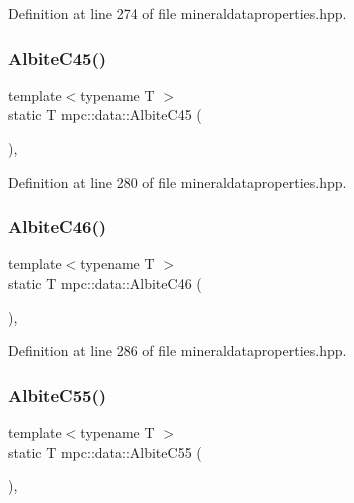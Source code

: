 Definition at line 274 of file mineraldataproperties.\+hpp.

\mbox{\label{namespacempc_1_1data_a42c2c3b8fc48f4389b0cf13f6fe2d993}} 
\subsubsection{\texorpdfstring{Albite\+C45()}{AlbiteC45()}}
{\footnotesize\ttfamily template$<$typename T $>$ \\
static T mpc\+::data\+::\+Albite\+C45 (\begin{DoxyParamCaption}{ }\end{DoxyParamCaption})\hspace{0.3cm}{\ttfamily [inline]}, {\ttfamily [static]}}



Definition at line 280 of file mineraldataproperties.\+hpp.

\mbox{\label{namespacempc_1_1data_ac964881e8421c24e60848c477b1a6377}} 
\subsubsection{\texorpdfstring{Albite\+C46()}{AlbiteC46()}}
{\footnotesize\ttfamily template$<$typename T $>$ \\
static T mpc\+::data\+::\+Albite\+C46 (\begin{DoxyParamCaption}{ }\end{DoxyParamCaption})\hspace{0.3cm}{\ttfamily [inline]}, {\ttfamily [static]}}



Definition at line 286 of file mineraldataproperties.\+hpp.

\mbox{\label{namespacempc_1_1data_ab06bb611e69a79e1030e7d74dd9ccf7a}} 
\subsubsection{\texorpdfstring{Albite\+C55()}{AlbiteC55()}}
{\footnotesize\ttfamily template$<$typename T $>$ \\
static T mpc\+::data\+::\+Albite\+C55 (\begin{DoxyParamCaption}{ }\end{DoxyParamCaption})\hspace{0.3cm}{\ttfamily [inline]}, {\ttfamily [static]}}



